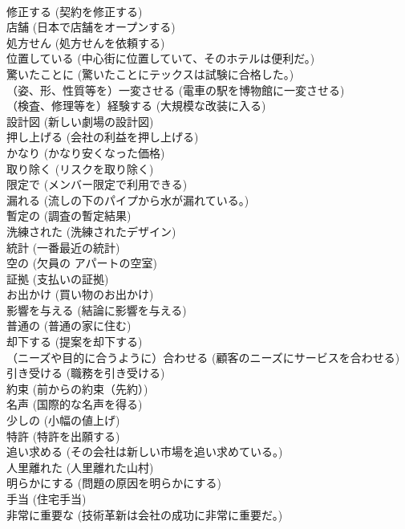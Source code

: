 \documentclass[8pt]{extreport}
\begin{document}
\begin{CJK}{UTF8}{min}
\\	修正する	(契約を修正する)		
\\	店舗	(日本で店舗をオープンする)		
\\	処方せん	(処方せんを依頼する)		
\\	位置している	(中心街に位置していて、そのホテルは便利だ。)		
\\	驚いたことに	(驚いたことにテックスは試験に合格した。)		
\\	（姿、形、性質等を）一変させる	(電車の駅を博物館に一変させる)		
\\	（検査、修理等を）経験する	(大規模な改装に入る)		
\\	設計図	(新しい劇場の設計図)		
\\	押し上げる	(会社の利益を押し上げる)		
\\	かなり	(かなり安くなった価格)		
\\	取り除く	(リスクを取り除く)		
\\	限定で	(メンバー限定で利用できる)		
\\	漏れる	(流しの下のパイプから水が漏れている。)		
\\	暫定の	(調査の暫定結果)		
\\	洗練された	(洗練されたデザイン)		
\\	統計	(一番最近の統計)		
\\	空の	(欠員の アパートの空室)		
\\	証拠	(支払いの証拠)		
\\	お出かけ	(買い物のお出かけ)		
\\	影響を与える	(結論に影響を与える)		
\\	普通の	(普通の家に住む)		
\\	却下する	(提案を却下する)		
\\	（ニーズや目的に合うように）合わせる	(顧客のニーズにサービスを合わせる)		
\\	引き受ける	(職務を引き受ける)		
\\	約束	(前からの約束（先約）)		
\\	名声	(国際的な名声を得る)		
\\	少しの	(小幅の値上げ)		
\\	特許	(特許を出願する)		
\\	追い求める	(その会社は新しい市場を追い求めている。)		
\\	人里離れた	(人里離れた山村)		
\\	明らかにする	(問題の原因を明らかにする)		
\\	手当	(住宅手当)		
\\	非常に重要な	(技術革新は会社の成功に非常に重要だ。)		

\end{CJK}
\end{document}
